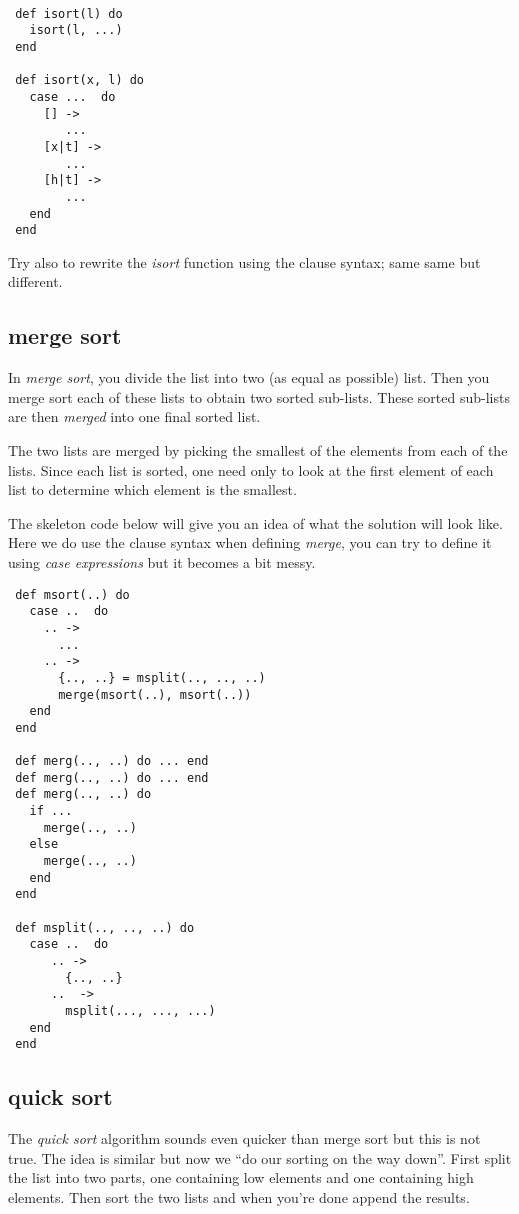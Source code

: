 \documentclass[a4paper,11pt]{article}
\begin{document}
\begin{verbatim}

 def isort(l) do 
   isort(l, ...)
 end

 def isort(x, l) do
   case ...  do
     [] -> 
        ...
     [x|t] ->
        ...
     [h|t] ->
        ...
   end
 end
\end{verbatim}

Try also to rewrite the {\em isort} function using the clause syntax;
same same but different.


\subsection{merge sort}

In {\em merge sort}, you divide the list into two (as equal as
possible) list. Then you merge sort each of these lists to obtain two
sorted sub-lists. These sorted sub-lists are then {\em merged} into
one final sorted list. 

The two lists are merged by picking the smallest of the elements from
each of the lists. Since each list is sorted, one need only to look at
the first element of each list to determine which element is the
smallest.

The skeleton code below will give you an idea of what the solution
will look like. Here we do use the clause syntax when defining {\em
  merge}, you can try to define it using {\em case expressions} but it
becomes a bit messy.

\begin{verbatim}
 def msort(..) do
   case ..  do
     .. -> 
       ...
     .. ->
       {.., ..} = msplit(.., .., ..)
       merge(msort(..), msort(..))
   end
 end

 def merg(.., ..) do ... end
 def merg(.., ..) do ... end
 def merg(.., ..) do
   if ... 
     merge(.., ..)
   else 
     merge(.., ..)
   end
 end

 def msplit(.., .., ..) do
   case ..  do
      .. -> 
        {.., ..}
      ..  ->
        msplit(..., ..., ...)
   end
 end
\end{verbatim}

\subsection{quick sort}

The {\em quick sort} algorithm sounds even quicker than merge sort but
this is not true. The idea is similar but now we ``do our sorting on
the way down''. First split the list into two parts, one containing low
elements and one containing high elements. Then sort the two lists and
when you're done append the results. 
\end{document}
